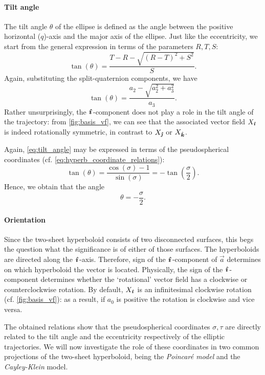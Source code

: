 \paragraph{Tilt angle} The tilt angle $\theta$ of the ellipse is defined as the angle between the positive horizontal ($q$)-axis and the major axis of the ellipse. Just like the eccentricity, we start from the general expression in terms of the parameters $R, T, S$:
\begin{equation}
    \tan(\theta) = \frac{T - R - \sqrt{(R - T)^2 + S^2}}{S}.
\end{equation}
Again, substituting the split-quaternion components, we have
\begin{equation}
    \tan(\theta) = \frac{a_2 - \sqrt{a_2^2 + a_3^2}}{a_3}.
    \label{eq:tilt_angle}
\end{equation}
Rather unsurprisingly, the $\quati$-component does not play a role in the tilt angle of the trajectory: from \cref{fig:basis_vf}, we can see that the associated vector field $X_\quati$ is indeed rotationally symmetric, in contrast to $X_\quatj$ or $X_\quatk$.

Again, \cref{eq:tilt_angle} may be expressed in terms of the pseudospherical coordinates (cf. \cref{eq:hyperb_coordinate_relations}):
$$ \tan(\theta) = \frac{\cos(\sigma) - 1}{\sin(\sigma)} = -\tan(\frac{\sigma}{2}).$$
Hence, we obtain that the angle 
$$\theta = -\frac{\sigma}{2}.$$

\paragraph{Orientation} Since the two-sheet hyperboloid consists of two disconnected surfaces, this begs the question what the significance is of either of those surfaces. The hyperboloids are directed along the $\quati$-axis. Therefore, sign of the $\quati$-component of $\vec{a}$ determines on which hyperboloid the vector is located. Physically, the sign of the $\quati$-component determines whether the `rotational' vector field has a clockwise or counterclockwise rotation. By default, $X_\quati$ is an infinitesimal clockwise rotation (cf. \cref{fig:basis_vf}): as a result, if $a_0$ is positive the rotation is clockwise and vice versa.

The obtained relations show that the pseudospherical coordinates $\sigma, \tau$ are directly related to the tilt angle and the eccentricity respectively of the elliptic trajectories. We will now investigate the role of these coordinates in two common projections of the two-sheet hyperboloid, being the \emph{Poincaré model} and the \emph{Cayley-Klein} model.

